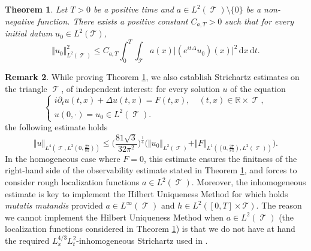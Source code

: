 \documentclass[a4paper,11pt]{amsart}
\numberwithin{equation}{section}
\newtheorem{thm}{Theorem}[section]
\theoremstyle{definition}
\newtheorem{rk}[thm]{Remark}
\DeclareMathOperator{\var}{\mathcal T}
\begin{document}
\begin{thm}\label{thm:obstriangle} 
Let $T>0$ be a positive time and $a\in L^2(\var)\setminus\{0\}$ be a non-negative function. There exists a positive constant $C_{a,T}>0$ such that for every initial datum $u_0\in L^2(\mathcal T)$,
\[
	\Vert u_0\Vert^2_{L^2(\var)}\le C_{a,T}\int_0^T\int_{\var}a(x)\big\vert(e^{it\Delta}u_0)(x)\big\vert^2\,\mathrm dx\,\mathrm dt.
\]
\end{thm}

\begin{rk}\label{rk:stritri} 
While proving Theorem \ref{thm:obstriangle}, we also establish Strichartz estimates on the triangle $\var$, of independent interest: for every solution $u$ of the equation
\[
    \begin{cases}
	    i\partial_t u(t,x) + \Delta u(t,x) = F(t,x),\quad (t,x)\in\mathbb R\times\var, \\
    	u(0,\cdot) = u_0\in L^2(\var).
    \end{cases}
\]
the following estimate holds
\begin{equation}\label{eq:inhomostritri}
	\Vert u\Vert_{L^4(\var,L^2(0, \frac{27}{8\pi}))}
	\le\bigg(\frac{81\sqrt{3}}{32\pi^2}\bigg)^{\frac 14}\big(\Vert u_0\Vert_{L^2(\var)}+ \Vert F\Vert_{L^1((0,\frac{27}{8\pi}),L^2(\var))}\big).
\end{equation}
In the homogeneous case where $F=0$, this estimate ensures the finitness of the right-hand side of the observability estimate stated in Theorem \ref{thm:obstriangle}, and forces to consider rough localization functions $a\in L^2(\var)$.
Moreover, the inhomogeneous estimate is key to implement the Hilbert Uniqueness Method for which \cite[Proposition 4.1]{BZ} holds \textit{mutatis mutandis} provided $a\in L^{\infty}(\var)$ and $h \in L^2([0,T]\times\mathcal T)$. The reason  we cannot implement the Hilbert Uniqueness Method when $a\in L^2(\var)$ (the localization functions considered in Theorem \ref{thm:obstriangle}) is that we do not have at hand the required $L^{4/3}_xL^2_t$-inhomogeneous Strichartz used in \cite[Proposition 4.1]{BZ}.
\end{rk}
\end{document}
